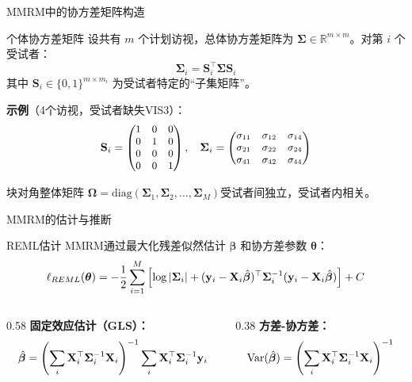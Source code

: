 \documentclass[aspectratio=169,11pt]{beamer}
\newcommand{\by}{\mathbf{y}}
\newcommand{\bX}{\mathbf{X}}
\newcommand{\bbeta}{\boldsymbol{\beta}}
\newcommand{\btheta}{\boldsymbol{\theta}}
\newcommand{\bSigma}{\boldsymbol{\Sigma}}
\newcommand{\bOmega}{\boldsymbol{\Omega}}
\newcommand{\bS}{\mathbf{S}}
\newcommand{\Var}{\mathrm{Var}}
\newcommand{\diag}{\mathrm{diag}}
\begin{document}
\begin{frame}{MMRM中的协方差矩阵构造}
\begin{block}{个体协方差矩阵}
设共有 $m$ 个计划访视，总体协方差矩阵为 $\bSigma \in \mathbb{R}^{m \times m}$。对第 $i$ 个受试者：
\vspace{-0.2cm}
\[
\bSigma_i = \bS_i^\top \bSigma \bS_i
\]
\vspace{-0.2cm}
其中 $\bS_i \in \{0,1\}^{m \times m_i}$ 为受试者特定的``子集矩阵''。
\end{block}

\textbf{示例}（4个访视，受试者缺失VIS3）：
\[
\small
\bS_i = \begin{pmatrix} 1 & 0 & 0 \\ 0 & 1 & 0 \\ 0 & 0 & 0 \\ 0 & 0 & 1 \end{pmatrix}, \quad
\bSigma_i = \begin{pmatrix} \sigma_{11} & \sigma_{12} & \sigma_{14} \\ \sigma_{21} & \sigma_{22} & \sigma_{24} \\ \sigma_{41} & \sigma_{42} & \sigma_{44} \end{pmatrix}
\]

\begin{exampleblock}{块对角整体矩阵}
\vspace{-0.2cm}
$\bOmega = \diag(\bSigma_1, \bSigma_2, \dots, \bSigma_M)$\quad\quad 受试者间独立，受试者内相关。
\end{exampleblock}
\end{frame}

\begin{frame}{MMRM的估计与推断}
\begin{block}{REML估计}
\vspace{-0.2cm}
MMRM通过最大化残差似然估计 $\bbeta$ 和协方差参数 $\btheta$：
\[
\small
\ell_{REML}(\btheta) = -\frac{1}{2} \sum_{i=1}^{M} \left[ \log |\bSigma_i| + (\by_i - \bX_i \hat{\bbeta})^\top \bSigma_i^{-1} (\by_i - \bX_i \hat{\bbeta}) \right] + C
\]
\end{block}

\vspace{-0.3cm}
\begin{columns}[T,totalwidth=\textwidth]
\begin{column}{0.58\textwidth}
\textbf{固定效应估计（GLS）：}
\vspace{-0.3cm}
\[
\footnotesize
\hat{\bbeta} = \left( \sum_{i} \bX_i^\top \bSigma_i^{-1} \bX_i \right)^{-1} \sum_{i} \bX_i^\top \bSigma_i^{-1} \by_i
\]
\end{column}
\begin{column}{0.38\textwidth}
\textbf{方差-协方差：}
\vspace{-0.3cm}
\[
\footnotesize
\Var(\hat{\bbeta}) = \left( \sum_{i} \bX_i^\top \bSigma_i^{-1} \bX_i \right)^{-1}
\]
\end{column}
\end{columns}
\end{frame}
\end{document}
